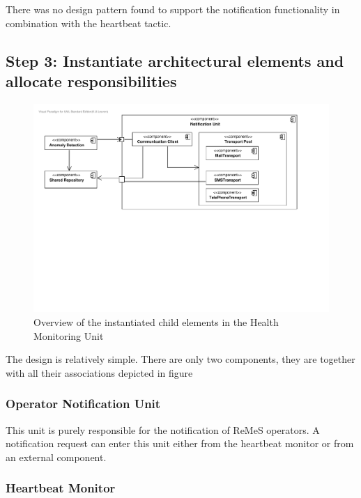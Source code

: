 \npar There was no design pattern found to support the notification
functionality in combination with the heartbeat tactic.

\subsection{Step 3: Instantiate architectural elements and allocate responsibilities}
\label{add:it8/elements}

\begin{figure}[H]
	\begin{centering}
		\includegraphics[width=\textwidth]{figs/add-it8-elements.pdf}
		\caption{Overview of the instantiated child elements in the Health Monitoring
		Unit}
		\label{fig:it8/elements}
	\end{centering}
\end{figure}

\npar The design is relatively simple. There are only two components, they are
together with all their associations depicted in figure
\subsubsection{Operator Notification Unit}

\npar This unit is purely responsible for the notification of ReMeS operators. A
notification request can enter this unit either from the heartbeat monitor or
from an external component.

\subsubsection{Heartbeat Monitor}

